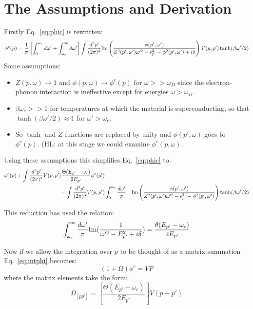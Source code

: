 \documentclass{article}
\begin{document}
\section{The Assumptions and Derivation}
%
Firstly Eq.~\ref{eq:phic} is rewritten:
%
\begin{eqnarray}
\label{eq:phic1}
\phi^{c}(p) = \frac{1}{\pi}\left[\int_{0}^{\omega_{c}} d\omega' + \int_{\omega_{c}}^{\infty} d\omega' \right]
\int \frac{d^{3} p'}{(2\pi)^{3}}{\rm Im}\left(\frac{\phi(p',\omega')}
{Z^{2}(p',\omega')\omega'^{2}-\epsilon_{p'}^{2}-\phi^{2}(p',\omega') +i\delta}\right)V(p,p')\tanh(\beta \omega'/2)
\end{eqnarray}
%
Some assumptions:
%
\begin{itemize}
\item $Z(p,\omega) \rightarrow 1$ and $\phi(p,\omega)\rightarrow \phi^{c}(p)$ for $\omega>>\omega_{D}$ since
the electron-phonon interaction is ineffective except for energies $\omega>\omega_{D}$.

\item $\beta\omega_{c}>>1$ for temperatures at which the material is superconducting, so that 
$\tanh(\beta\omega'/2)\approx 1$ for $\omega'>\omega_{c}$. 

\item So $\tanh$ and $Z$ functions are replaced by unity and $\phi(p',\omega)$ 
goes to $\phi^{c}(p)$. (HL: at this stage we could examine $\phi^{c}(p,\omega)$.
\end{itemize}
%
Using these assumptions this simplifies Eq.~\ref{eq:phic} to: 
%
\begin{align}
\label{eq:intphi}
\phi^{c}(p) + \int \frac{d^{3}p'}{(2\pi)^{3}}V(p,p')
\frac{\Theta(E_{p'}-\omega_{c})}{2E_{p'}}\phi^{c}(p') \nonumber & &\\
 = \int \frac{d^{3}p'}{(2\pi)^{3}}V(p,p') & \int_{0}^{\omega_{c}}\frac{d\omega'}{\pi} &
{\rm Im}\left(\frac{\phi(p',\omega')}{Z^{2}(p', \omega')\omega'^{2}-\epsilon^{2}_{p'}-\phi^{2}(p',\omega')}\right)\tanh(\beta\omega'/2)
\end{align}

This reduction has used the relation:
%
\begin{equation}
\label{eq:pair}
\int_{\omega_{c}}^{\infty} \frac{d\omega'}{\pi}{\rm Im} (\frac{1}{\omega'^{2}-E^{2}_{p'}+i\delta}) 
= \frac{\theta(E_{p'}-\omega_{c})}{2E_{p'}}
\end{equation}

Now if we allow the integration over $p$ to be thought of as a matrix summation
Eq.~\ref{eq:intphi} becomes:
%
\begin{equation}
\label{eq:matrixcoul}
(1+\Omega)\phi^{c}=VF
\end{equation}
%
where the matrix elements take the form:
%
\begin{equation}
\Omega_{[pp']} =  \left[\frac{\Theta(E_{p'}-\omega_{c})}{2E_{p'}}\right]V(p-p')
\end{equation}
\end{document}
